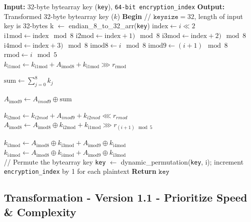 \documentclass[11pt]{article}
\theoremstyle{definition}
\theoremstyle{remark}
\newcommand{\COMMENT}[1]{\State \textcolor[HTML]{003e57}{// #1}}
\begin{document}
\begin{algorithm}[H] %
\caption{The key transformation operation per encryption}
\begin{algorithmic}[1]  %
\State \textbf{Input:} 32-byte bytearray key (\texttt{key}), \texttt{64-bit encryption\_index}
\State \textbf{Output:} Transformed 32-byte bytearray key ($k$)
\State \textbf{Begin}
\COMMENT{$\texttt{keysize} = 32$, length of input key is 32-bytes}
\State k $\gets$ endian\_8\_to\_32\_arr(\texttt{key})
	\State $\mathrm{index} \gets i \ll 2$
	\State $\mathrm{i1mod} \gets \mathrm{index} \mod 8$
	\State $\mathrm{i2mod} \gets \mathrm{index}+1) \mod 8$
	\State $\mathrm{i3mod} \gets \mathrm{index}+2) \mod 8$
	\State $\mathrm{i4mod} \gets \mathrm{index}+3) \mod 8$
	\State $\mathrm{imod8} \gets i \mod 8$
	\State $\mathrm{imod9} \gets (i+1) \mod 8$
	\State $\mathrm{rmod} \gets i \mod 5$ \\

	\State $k_\mathrm{i1mod} \gets k_\mathrm{i1mod} + A_\mathrm{imod8} + k_\mathrm{i1mod} \ggg r_\mathrm{rmod}$

	\State $ \mathrm{sum} \gets \displaystyle \sum_{j=0}^8 k_j$

	\State $A_\mathrm{imod9} \gets A_{imod9} \oplus \text{sum}$

	\State $k_\mathrm{i2mod} \gets k_{i2mod} + A_{imod9} + k_{i2mod} \lll r_{rmod}$
	\State $A_\mathrm{imod8} \gets A_\mathrm{imod8} \oplus k_\mathrm{i2mod} + k_\mathrm{i1mod} \ggg r_{(i+1) \mod 5}$

	\State $k_\mathrm{i3mod} \gets A_\mathrm{imod8} \oplus k_\mathrm{i3mod} + A_\mathrm{imod9} \oplus k_\mathrm{i4mod}$
	\State $k_\mathrm{i4mod} \gets A_\mathrm{imod8} \oplus k_\mathrm{i4mod} + A_\mathrm{imod9} \oplus k_\mathrm{i3mod}$ \\

	\COMMENT{Permute the bytearray key}
	\State \texttt{key} $\gets$ dynamic\_permutation(\texttt{key}, i);
\State increment \texttt{encryption\_index} by 1 for each plaintext
\EndFor
\State \textbf{Return} $\texttt{key}$
\end{algorithmic}
\end{algorithm}

\subsection{Transformation - Version 1.1 - Prioritize Speed \& Complexity}
\end{document}
